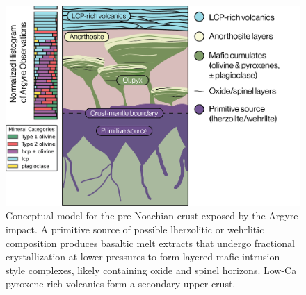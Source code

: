\documentclass[12pt]{article}
\begin{document}
\begin{figure}
    \centering
    \includegraphics[width=\textwidth]
    {figures/04_crust_strat_sketch_v2.png}
    \caption{Conceptual model for the pre-Noachian crust exposed by the Argyre impact. A primitive source of possible lherzolitic or wehrlitic composition produces basaltic melt extracts that undergo fractional crystallization at lower pressures to form layered-mafic-intrusion style complexes, likely containing oxide and spinel horizons. Low-Ca pyroxene rich volcanics form a secondary upper crust.}
    \label{fig:concept_sketch}
\end{figure}
\end{document}
